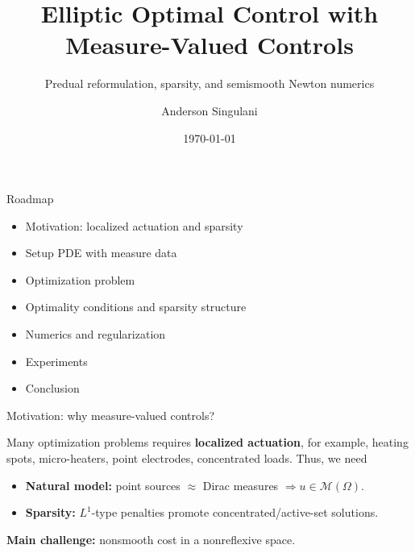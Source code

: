 \documentclass[aspectratio=169]{beamer}
\title[Elliptic Control with Measures]{Elliptic Optimal Control with Measure-Valued Controls}
\subtitle{Predual reformulation, sparsity, and semismooth Newton numerics}
\author{Anderson Singulani}
\institute{Seminar}
\date{\today}
\begin{document}
\begin{frame}
  \titlepage
\end{frame}

\begin{frame}{Roadmap}
\begin{itemize}
  \item Motivation: localized actuation and sparsity
  \item Setup PDE with measure data
  \item Optimization problem 
  \item Optimality conditions and sparsity structure 
  \item Numerics and regularization
  \item Experiments
  \item Conclusion
\end{itemize}
\end{frame}

\begin{frame}{Motivation: why measure-valued controls?}

Many optimization problems requires \textbf{localized actuation}, for example, heating spots, micro-heaters, point electrodes, concentrated loads. Thus, we need
\begin{itemize}  
  \item \textbf{Natural model:} point sources $\approx$ Dirac measures $\Rightarrow u\in\mathcal M(\Omega)$.
  \item \textbf{Sparsity:} $L^1$-type penalties promote concentrated/active-set solutions.
\end{itemize}



\medskip
\textbf{Main challenge:} nonsmooth cost in a nonreflexive space.
\end{frame}
\end{document}
